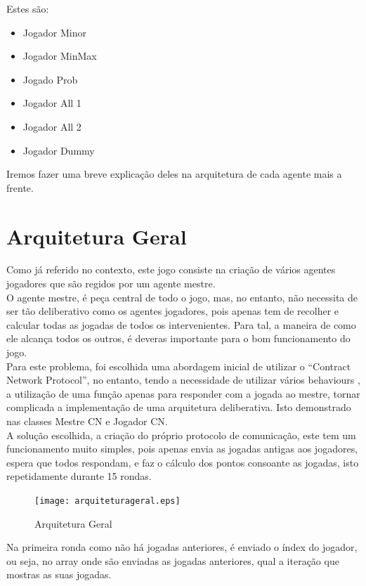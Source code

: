\documentclass[12pt]{article}
\begin{document}
    Estes são:

    \begin{itemize}
        \item Jogador Minor
        \item Jogador MinMax
        \item Jogado Prob
        \item Jogador All 1
        \item Jogador All 2
        \item Jogador Dummy
    \end{itemize}

    
    Iremos fazer uma breve explicação deles na arquitetura de cada agente mais a frente.
	
	\section*{Arquitetura Geral}
	Como já referido no contexto, este jogo consiste na criação de vários agentes jogadores que são regidos por um agente mestre.\\
    O agente mestre, é peça central de todo o jogo, mas, no entanto, não necessita de ser tão deliberativo como os agentes jogadores, pois apenas tem de recolher e calcular todas as jogadas de todos os intervenientes. Para tal, a maneira de como ele alcança todos os outros, é deveras importante para o bom funcionamento do jogo. \\
    Para este problema, foi escolhida uma abordagem inicial de utilizar o “Contract Network Protocol”, no entanto, tendo a necessidade de utilizar vários behaviours , a utilização de uma função apenas para responder com a jogada ao mestre, tornar complicada a implementação de uma arquitetura deliberativa. Isto demonstrado nas classes Mestre CN e Jogador CN.\\
    A solução escolhida, a criação do próprio protocolo de comunicação, este tem um funcionamento muito simples, pois apenas envia as jogadas antigas aos jogadores, espera que todos respondam, e faz o cálculo dos pontos consoante as jogadas, isto repetidamente durante 15 rondas.
    
    	
	\begin{figure}[h]
		\centering
		\texttt{[image: arquiteturageral.eps]}
		\caption{Arquitetura Geral}
		\label{fig:arquiteturageral}
	\end{figure}
	
	
	Na primeira ronda como não há jogadas anteriores, é enviado o índex do jogador, ou seja, no array onde são enviadas as jogadas anteriores, qual a iteração que mostras as suas jogadas.\\
	
\end{document}
